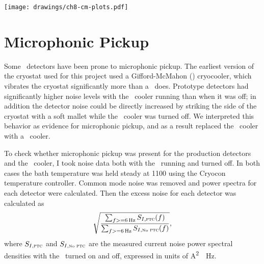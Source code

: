\begin{figure*}
\texttt{[image: drawings/ch8-cm-plots.pdf]}
\caption{Plots summarizing common mode signal and $1/f$ noise.
\textbf{Upper Left}
Plow showing raw detector output for 15 detectors over a 10-minute data acquisition.
Only every 100th data point is plotted, which makes the white noise level appear somewhat smaller than it really is. 
\textbf{Upper Right} 
The same data after removal of the mean signal.
\textbf{Upper Left} 
Current noise power spectral density for the raw data, the raw data minus the common mode (``No CM''), the raw data minus the common mode and the best-fit 4th-order polynomial (``No CM, Poly''), and the common mode itself.
The strong noise peak at \SI{1.411}{\Hz} is due to the \PTC, as explained in the text.
\textbf{Lower Right} 
Raw datastream for , after conversion to a bath temperature variation, as described in the text.
}
\label{fig:ch8-cm-plots}
\end{figure*}

\section{Microphonic Pickup}


Some \TES\ detectors have been prone to microphonic pickup.
The earliest version of the cryostat used for this project used a Gifford-McMahon (\GM) cryocooler, which vibrates the cryostat significantly more than a \PTC\ does.
Prototype detectors had significantly higher noise levels with the \GM\ cooler running than when it was off; in addition the detector noise could be directly increased by striking the side of the cryostat with a soft mallet while the \GM\ cooler was turned off.
We interpreted this behavior as evidence for microphonic pickup, and as a result replaced the \GM\ cooler with a \PTC\ cooler.

To check whether microphonic pickup was present for the production detectors and the \PTC\ cooler, I took noise data both with the \PTC\ running and turned off.
In both cases the bath temperature was held steady at \SI{1100}{\mK} using the Cryocon temperature controller.
Common mode noise was removed and power spectra for each detector were calculated.
Then the excess noise for each detector was calculated as
\begin{equation}
  \sqrt{  \frac{ \sum_{f >= \SI{6}{\Hz}} S_{I,\textsc{ptc}}(f) }
               { \sum_{f >= \SI{6}{\Hz}} S_{I,\mbox{\tiny{No}}\textsc{ ptc}}(f) }},
\end{equation}
where $S_{I,\textsc{ptc}}$ and $S_{I,\mbox{\tiny{No}}\textsc{ ptc}}$ are the measured current noise power spectral densities with the \PTC\ turned on and off, expressed in units of \si{\A^2 \per \Hz}.

